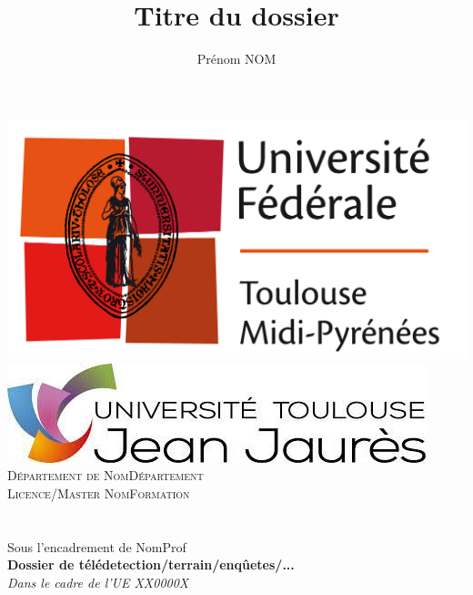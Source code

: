 \documentclass[a4paper,11pt]{article}
\title{Titre du dossier}
\author{Prénom NOM}
\begin{document}
\makeatletter
  \begin{titlepage}
  \centering
      \includegraphics[height=0.08\textheight]{images/Logo_univ_toulouse.jpg}
      \hfill
      \includegraphics[height=0.05\textheight]{images/logo_ut2j.jpg}\\
      \vspace{2cm}
      {\large \textsc{Département de NomDépartement}}\\
      \textsc{Licence/Master NomFormation}\\
    \vspace{2cm}
      {\Huge \textbf{\@title}} \\
    \vspace{0.5cm}
      {\large \@author} \\
      Sous l'encadrement de NomProf\\
    \vfill
      {\large\textbf{Dossier de télédetection/terrain/enqûetes/...}\\
      \textit{Dans le cadre de l'UE XX0000X}}\\
      \vspace*{\fill}
      \@date
  \end{titlepage}
\makeatother
\newpage
\thispagestyle{empty}
\null 
\newpage
\thispagestyle{empty}  
\tableofcontents
 


\printbibliography[title=Bibliographie, heading=bibintoc]
\newpage
\listoffigures
\newpage
\listoftables

\end{document}
